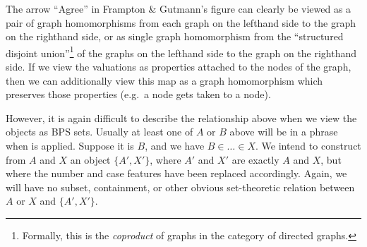 \documentclass[output=paper]{langsci/langscibook}
\begin{document}
{
\z}

The arrow \enquote{Agree} in Frampton \& Gutmann's figure can clearly be viewed
as a pair of graph homomorphisms from each graph on the lefthand side to the
graph on the righthand side, or as single graph homomorphism from the
``structured disjoint union''\footnote{Formally, this is the \emph{coproduct}
    of graphs in the category of directed graphs.} of the graphs on the
    lefthand side to the graph on the righthand side. If we view the valuations
    as properties attached to the nodes of the graph, then we can additionally
    view this map  as a graph homomorphism which preserves those
    properties (e.g.\ a \Pl{} node gets taken to a \Pl{} node).

However, it is again difficult to describe the relationship above when we view
the objects as \gls{BPS} sets. Usually at least one of $A$ or $B$ above will be
in a phrase when  is applied. Suppose it is $B$, and we have
$B\in\ldots\in X$. We intend to construct from $A$ and $X$ an object
$\{A',X'\}$, where $A'$ and $X'$ are exactly $A$ and $X$, but where the number
and case features have been replaced accordingly. Again, we will have no
subset, containment, or other obvious set-theoretic relation between $A$ or $X$
and $\{A',X'\}$.
\end{document}
